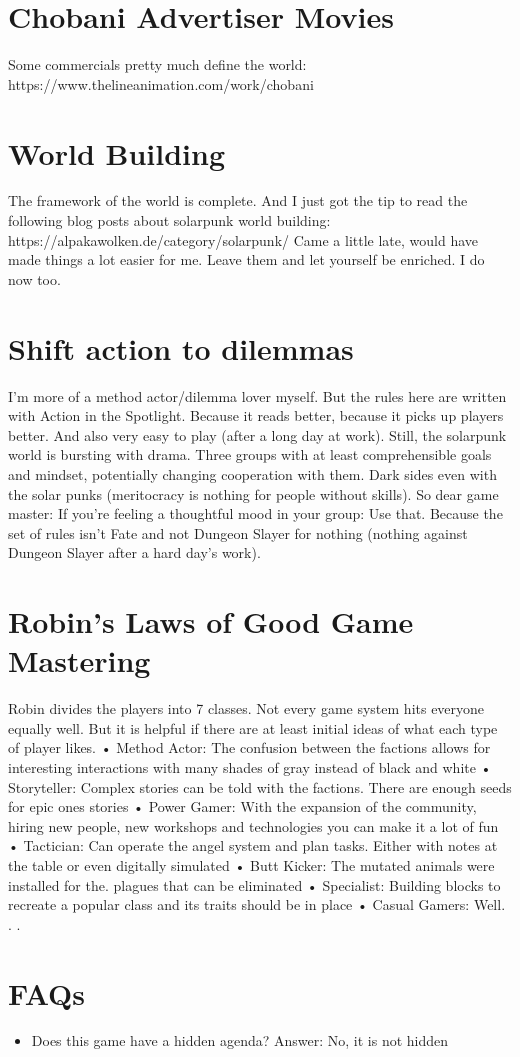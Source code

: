 \section{Chobani Advertiser Movies}
Some commercials pretty much define the world: https://www.thelineanimation.com/work/chobani

\section{World Building}
The framework of the world is complete. And I just got the tip to read the following blog posts about solarpunk world building:
https://alpakawolken.de/category/solarpunk/
Came a little late, would have made things a lot easier for me. Leave them and let yourself be enriched. I do now too.

\section{Shift action to dilemmas}
I'm more of a method actor/dilemma lover myself. But the rules here are written with Action in the Spotlight. Because it reads
better, because it picks up players better. And also very easy to play (after a long day at work).
Still, the solarpunk world is bursting with drama. Three groups with at least comprehensible goals and mindset, potentially changing
cooperation with them. Dark sides even with the solar punks (meritocracy is nothing for people without skills).
So dear game master: If you're feeling a thoughtful mood in your group: Use that. Because the set of rules isn't Fate and not
Dungeon Slayer for nothing (nothing against Dungeon Slayer after a hard day's work).

\section{Robin's Laws of Good Game Mastering}

Robin divides the players into 7 classes. Not every game system hits everyone equally well. But it is helpful if there are at least
initial ideas of what each type of player likes.
• Method Actor: The confusion between the factions allows for interesting interactions with many shades of gray instead of
black and white
• Storyteller: Complex stories can be told with the factions. There are enough seeds for epic ones
stories
• Power Gamer: With the expansion of the community, hiring new people, new workshops and technologies you can make it
a lot of fun
• Tactician: Can operate the angel system and plan tasks. Either with notes at the table or even
digitally simulated
• Butt Kicker: The mutated animals were installed for the. plagues that can be eliminated
• Specialist: Building blocks to recreate a popular class and its traits should be in place
• Casual Gamers: Well. . .

\section{FAQs}
\begin{itemize}
    \item Does this game have a hidden agenda? Answer: No, it is not hidden
\end{itemize}